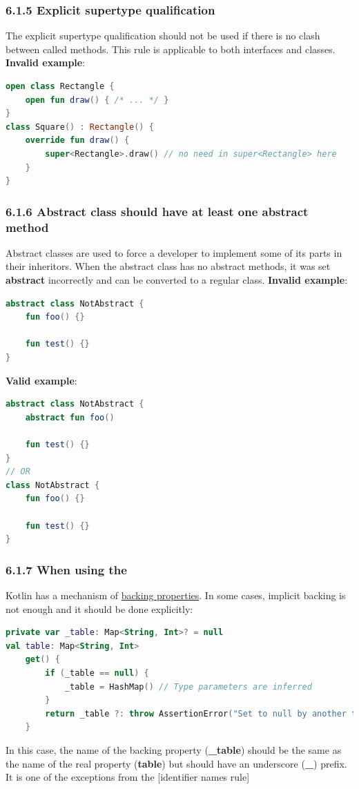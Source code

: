 \subsubsection*{\textbf{6.1.5 Explicit supertype qualification}}
\leavevmode\newline
\label{sec:6.1.5}
The explicit supertype qualification should not be used if there is no clash between called methods. This rule is applicable to both interfaces and classes.
\textbf{Invalid example}:
\begin{lstlisting}[language=Kotlin]
open class Rectangle {
    open fun draw() { /* ... */ }
}
class Square() : Rectangle() {
    override fun draw() {
        super<Rectangle>.draw() // no need in super<Rectangle> here
    }
}
\end{lstlisting}
\subsubsection*{\textbf{6.1.6 Abstract class should have at least one abstract method}}
\leavevmode\newline
\label{sec:6.1.6}
Abstract classes are used to force a developer to implement some of its parts in their inheritors.
When the abstract class has no abstract methods, it was set \textbf{abstract} incorrectly and can be converted to a regular class.
\textbf{Invalid example}:
\begin{lstlisting}[language=Kotlin]
abstract class NotAbstract {
    fun foo() {}

    fun test() {}
}
\end{lstlisting}
\textbf{Valid example}:
\begin{lstlisting}[language=Kotlin]
abstract class NotAbstract {
    abstract fun foo()

    fun test() {}
}
// OR
class NotAbstract {
    fun foo() {}

    fun test() {}
}
\end{lstlisting}
\subsubsection*{\textbf{6.1.7 When using the}}
\leavevmode\newline
\label{sec:6.1.7}
Kotlin has a mechanism of \href{https://kotlinlang.org/docs/reference/properties.html#backing-properties}{backing properties}.
In some cases, implicit backing is not enough and it should be done explicitly:
\begin{lstlisting}[language=Kotlin]
private var _table: Map<String, Int>? = null
val table: Map<String, Int>
    get() {
        if (_table == null) {
            _table = HashMap() // Type parameters are inferred
        }
        return _table ?: throw AssertionError("Set to null by another thread")
    }
\end{lstlisting}
In this case, the name of the backing property (\textbf{\_table}) should be the same as the name of the real property (\textbf{table}) but should have an underscore (\textbf{\_}) prefix.
It is one of the exceptions from the [identifier names rule]
